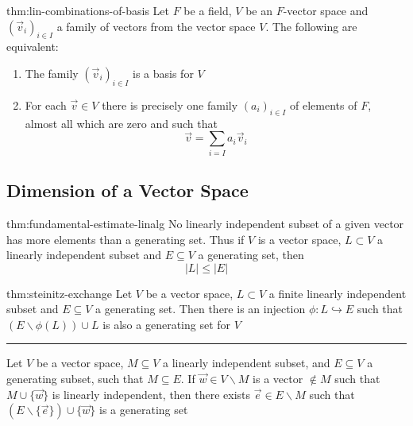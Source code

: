 \documentclass[landscape, 8pt]{extarticle}
\begin{document}
\begin{multicols}{3}
\vspace{-5pt}
\begin{thm}{thm:lin-combinations-of-basis}{}
    Let $F$ be a field, $V$ be an $F$-vector space and $(\vec{v}_{i})_{i\in I}$ a family of vectors from the vector space $V$. The following are equivalent:
    \begin{enumerate}
        \setlength\itemsep{0em}
        \item The family $(\vec{v}_{i})_{i\in I}$ is a basis for $V$
        \item For each $\vec{v}\in V$ there is precisely one family $(a_{i})_{i\in I}$ of elements of $F$, almost all which are zero and such that
            \[\vec{v} = \sum_{i = I} a_{i}\vec{v}_{i}\]
    \end{enumerate}
\end{thm}

\newpage
\subsection{Dimension of a Vector Space}

\begin{thm}{thm:fundamental-estimate-linalg}{}
    No linearly independent subset of a given vector has more elements than a generating set. Thus if $V$ is a vector space, $L \subset V$ a linearly independent subset and $E \subseteq V$ a generating set, then
    \[\lvert L \rvert \le \lvert E \rvert\]
\end{thm} 

\begin{thm}{thm:steinitz-exchange}{}
    Let $V$ be a vector space, $L \subset V$ a finite linearly independent subset and $E \subseteq V$ a generating set. Then there is an injection $\phi : L \hookrightarrow E$ such that $(E \backslash \phi(L)) \cup L$ is also a generating set for $V$
    
    \vspace{-5pt}
    \noindent\rule{\textwidth}{0.2pt}
    Let $V$ be a vector space, $M \subseteq V$ a linearly independent subset, and $E \subseteq V$ a generating subset, such that $M \subseteq E$. If $\vec{w}\in V\backslash M$ is a vector $\not\in M$ such that $M \cup \{ \vec{w}\}$ is linearly independent, then there exists $\vec{e}\in E \backslash M$ such that $(E \backslash \{\vec{e}\}) \cup \{\vec{w}\}$ is a generating set
\end{thm}


\end{multicols}
\end{document}
